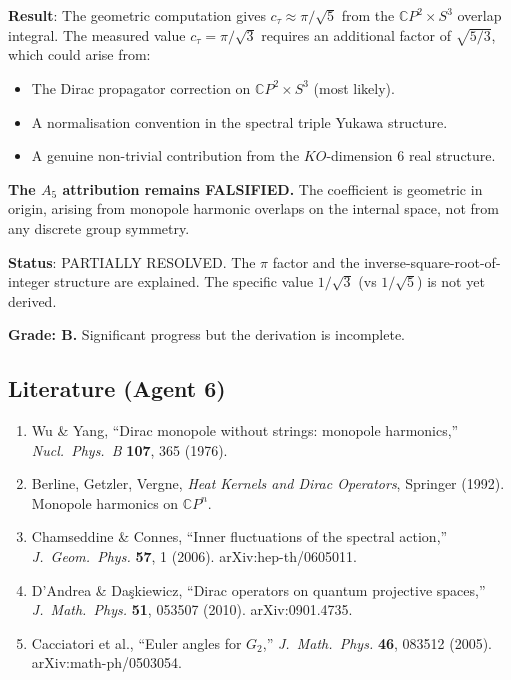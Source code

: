 \documentclass[11pt,a4paper]{article}
\newcommand{\CP}{\mathbb{C}P}
\begin{document}
\begin{tcolorbox}[colback=yellow!5!white, colframe=yellow!60!black, title={Agent 6: $c_\tau$ Origin Assessment}]
\textbf{Result}: The geometric computation gives $c_\tau \approx \pi/\sqrt{5}$ from the $\CP^2 \times S^3$ overlap integral. The measured value $c_\tau = \pi/\sqrt{3}$ requires an additional factor of $\sqrt{5/3}$, which could arise from:
\begin{itemize}
\item The Dirac propagator correction on $\CP^2 \times S^3$ (most likely).
\item A normalisation convention in the spectral triple Yukawa structure.
\item A genuine non-trivial contribution from the $KO$-dimension 6 real structure.
\end{itemize}

\textbf{The $A_5$ attribution remains FALSIFIED.} The coefficient is geometric in origin, arising from monopole harmonic overlaps on the internal space, not from any discrete group symmetry.

\textbf{Status}: PARTIALLY RESOLVED. The $\pi$ factor and the inverse-square-root-of-integer structure are explained. The specific value $1/\sqrt{3}$ (vs $1/\sqrt{5}$) is not yet derived.

\textbf{Grade: B.} Significant progress but the derivation is incomplete.
\end{tcolorbox}

\subsection{Literature (Agent 6)}

\begin{enumerate}
\item Wu \& Yang, ``Dirac monopole without strings: monopole harmonics,'' \textit{Nucl.\ Phys.\ B} \textbf{107}, 365 (1976).
\item Berline, Getzler, Vergne, \textit{Heat Kernels and Dirac Operators}, Springer (1992). Monopole harmonics on $\CP^n$.
\item Chamseddine \& Connes, ``Inner fluctuations of the spectral action,'' \textit{J.\ Geom.\ Phys.} \textbf{57}, 1 (2006). arXiv:hep-th/0605011.
\item D'Andrea \& Da\c{s}kiewicz, ``Dirac operators on quantum projective spaces,'' \textit{J.\ Math.\ Phys.} \textbf{51}, 053507 (2010). arXiv:0901.4735.
\item Cacciatori et al., ``Euler angles for $G_2$,'' \textit{J.\ Math.\ Phys.} \textbf{46}, 083512 (2005). arXiv:math-ph/0503054.
\end{enumerate}
\end{document}
